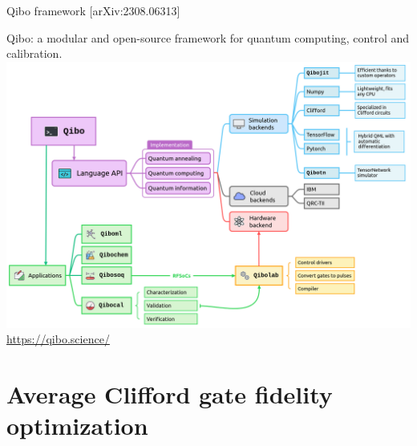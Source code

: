 \documentclass[aspectratio=169,10pt]{beamer}
\begin{document}
\begin{frame}[t,fragile]{Qibo framework \hfill{\small[arXiv:2308.06313]}}
  \setlength{\topskip}{0pt}
  \setlength{\textheight}{\paperheight}
  \vspace*{-0.5cm}
  \begin{center}
      {\fontsize{10pt}{0pt}\selectfont Qibo: a modular and open-source framework for quantum computing, control and calibration.}\\
      \vspace*{0.5em}
      \includegraphics[height=0.7\paperheight]{figures/qibo_ecosystem.png}\\
      \vfill
      {\fontsize{8pt}{0pt}\selectfont \url{https://qibo.science/}}
  \end{center}
\end{frame}



\section{Average Clifford gate fidelity optimization}
\end{document}
